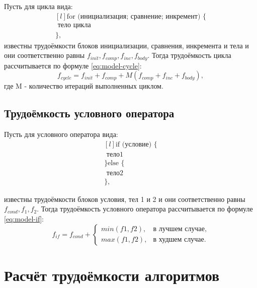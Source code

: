 Пусть для цикла вида:
\begin{equation}
	\label{eq:cycle}
	\begin{matrix*}[l]
		\text{for (инициализация; сравнение; инкремент) \{} \\
		\text{\ \ \ \ тело цикла}  \\
		\text{\},}
	\end{matrix*}
\end{equation}
известны трудоёмкости блоков инициализации, сравнения, инкремента и тела и они соответственно равны $f_{init}, f_{comp}, f_{inc}, f_{body}$.
Тогда трудоёмкость цикла рассчитывается по формуле \ref{eq:model-cycle}:
\begin{equation}
	\label{eq:model-cycle}
	f_{cycle} = f_{init} + f_{comp} + M(f_{comp} + f_{inc} + f_{body}),
\end{equation}
где M - количество итераций выполненных циклом.

\subsection{Трудоёмкость условного оператора}

Пусть для условного оператора вида:
\begin{equation}
	\label{eq:if}
	\begin{matrix*}[l]
		\text{if (условие) \{} \\
		\text{\ \ \ \ тело1}  \\
		\text{\} else \{} \\
		\text{\ \ \ \ тело2} \\
		\text{\},}
	\end{matrix*}
\end{equation}

известны трудоёмкости блоков условия, тел 1 и 2 и они соответственно равны $f_{cond}, f_{1}, f_{2}$.
Тогда трудоёмкость условного оператора рассчитывается по формуле \ref{eq:model-if}:
\begin{equation}
	\label{eq:model-if}
	f_{if} = f_{cond} + \begin{cases}
		min(f1, f2), &\text{в лучшем случае}, \\
		max(f1, f2), &\text{в худшем случае}.
	\end{cases}
\end{equation}

\section{Расчёт трудоёмкости алгоритмов}


